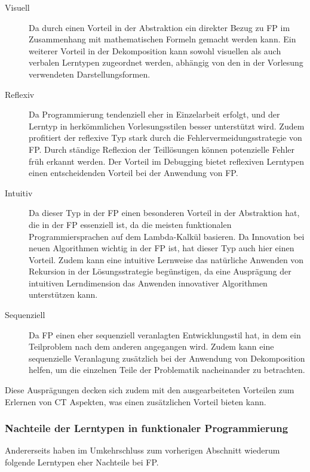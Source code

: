 \begin{description}
    \item[Visuell] Da durch einen Vorteil in der Abstraktion ein direkter Bezug zu FP im Zusammenhang mit mathematischen Formeln gemacht werden kann. Ein weiterer Vorteil in der Dekomposition kann sowohl visuellen als auch verbalen Lerntypen zugeordnet werden, abhängig von den in der Vorlesung verwendeten Darstellungsformen.
    \item[Reflexiv] Da Programmierung tendenziell eher in Einzelarbeit erfolgt, und der Lerntyp in herkömmlichen Vorlesungsstilen besser unterstützt wird. Zudem profitiert der reflexive Typ stark durch die Fehlervermeidungsstrategie von FP. Durch ständige Reflexion der Teillösungen können potenzielle Fehler früh erkannt werden. Der Vorteil im Debugging bietet reflexiven Lerntypen einen entscheidenden Vorteil bei der Anwendung von FP.
    \item[Intuitiv] Da dieser Typ in der FP einen besonderen Vorteil in der Abstraktion hat, die in der FP essenziell ist, da die meisten funktionalen Programmiersprachen auf dem Lambda-Kalkül basieren. Da Innovation bei neuen Algorithmen wichtig in der FP ist, hat dieser Typ auch hier einen Vorteil. Zudem kann eine intuitive Lernweise das natürliche Anwenden von Rekursion in der Lösungsstrategie begünstigen, da eine Ausprägung der intuitiven Lerndimension das Anwenden innovativer Algorithmen unterstützen kann.
    \item[Sequenziell] Da FP einen eher sequenziell veranlagten Entwicklungsstil hat, in dem ein Teilproblem nach dem anderen angegangen wird. Zudem kann eine sequenzielle Veranlagung zusätzlich bei der Anwendung von Dekomposition helfen, um die einzelnen Teile der Problematik nacheinander zu betrachten.
\end{description}

Diese Ausprägungen decken sich zudem mit den ausgearbeiteten Vorteilen zum Erlernen von CT Aspekten, was einen zusätzlichen Vorteil bieten kann.
\\
\subsubsection{Nachteile der Lerntypen in funktionaler Programmierung}

Andererseits haben im Umkehrschluss zum vorherigen Abschnitt wiederum folgende Lerntypen eher Nachteile bei FP.

